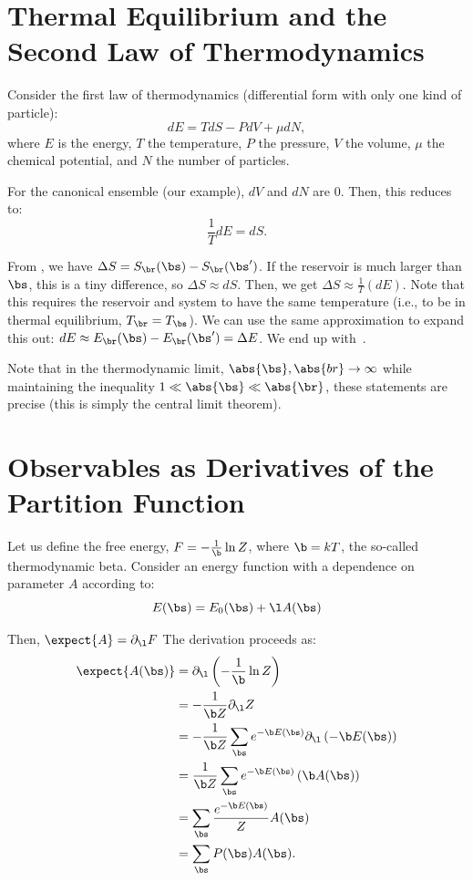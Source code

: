 \section{Thermal Equilibrium and the Second Law of
  Thermodynamics}\label{sec:delta-s-delta-e}
Consider the first law of thermodynamics (differential form with only
one kind of particle):%
\begin{equation}%
  dE=TdS-PdV+\mu dN,
\end{equation}%
where $E$ is the energy, $T$ the temperature, $P$ the pressure, $V$
the volume, $\mu$ the chemical potential, and $N$ the number of
particles.

For the canonical ensemble (our example), $dV$ and $dN$ are $0$.
Then, this reduces to:
\begin{equation}%
  \frac{1}{T}dE=dS.
\end{equation}%

From , we have
$\Delta S=S_{\br}(\bs)-S_{\br}(\bs')$.  If the reservoir is much
larger than $\bs$, this is a tiny difference, so
$\Delta S \approx dS$.  Then, we get
$\Delta S \approx \frac{1}{T}(dE)$. Note that this requires the
reservoir and system to have the same temperature (i.e., to be in
thermal equilibrium, $T_{\br}=T_{\bs}$).  We can use the same
approximation to expand this out:
$dE\approx E_{\br}(\bs)-E_{\br}(\bs')=\Delta E$.  We end up
with~.

Note that in the thermodynamic limit,
$\abs{\bs}, \abs{br}\rightarrow \infty$ while maintaining the
inequality $1\ll\abs{\bs}\ll\abs{\br}$, these statements are precise
(this is simply the central limit theorem).

\section{Observables as Derivatives of the Partition
  Function}\label{sec:Z-to-macros}
Let us define the free energy, $F=-\frac{1}{\b}\ln Z$, where $\b=k T$,
the so-called thermodynamic beta. Consider an energy function with a
dependence on parameter $A$ according to:%
\begin{equation}%
  E(\bs)=E_0(\bs)+\l A(\bs)
\end{equation}%

Then, $\expect{A}=\partial_\l F$ The derivation proceeds as:
\begin{align}%
  \expect{A(\bs)}&=\partial_\l \left( -\frac{1}{\b}\ln Z\right) \label{eq:expectation-as-derivative}\\
                 &=-\frac{1}{\b Z}\partial_\l Z\\
                 &=-\frac{1}{\b Z}\sum_{\bs} e^{-\b E(\bs)}\partial_\l\left(-\b E(\bs)\right) \\
                 &= \frac{1}{\b Z}\sum_{\bs} e^{-\b E(\bs)}\left(\b A(\bs) \right) \\
                 &= \sum_{\bs} \frac{e^{-\b E(\bs)}}{Z} A(\bs) \\
                 &= \sum_{\bs} P(\bs) A(\bs).
\end{align}%

